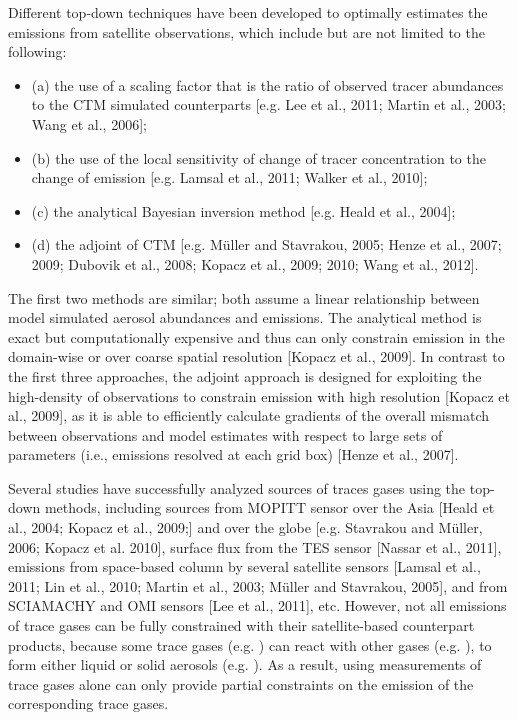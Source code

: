  Different top-down techniques have been developed to optimally estimates 
 the emissions from satellite observations, which include but are not 
 limited to the following: 
 \begin{itemize}
 \item (a) the use of a scaling factor that is the ratio of observed tracer abundances to 
 the CTM simulated counterparts [e.g. Lee et al., 2011; Martin et al., 2003; Wang et al., 2006];
 \item (b) the use of the local sensitivity of change of tracer concentration 
            to the change of emission [e.g. Lamsal et al., 2011; Walker et al., 2010]; 
 \item (c) the analytical Bayesian inversion method [e.g. Heald et al., 2004]; 
 \item (d) the adjoint of CTM [e.g. Müller and Stavrakou, 2005; 
           Henze et al., 2007; 2009; Dubovik et al., 2008; Kopacz et al., 2009; 2010; 
           Wang et al., 2012].  
 \end{itemize} 
 The first two methods are similar; 
 both assume a linear relationship between model simulated aerosol abundances and emissions. 
 The analytical method is exact but computationally expensive 
 and thus can only constrain emission in the domain-wise 
 or over coarse spatial resolution [Kopacz et al., 2009]. 
 In contrast to the first three approaches, the adjoint approach is designed 
 for exploiting the high-density of observations to constrain emission 
 with high resolution [Kopacz et al., 2009], as it is able to efficiently 
 calculate gradients of the overall mismatch between observations 
 and model estimates with respect to large sets of parameters 
 (i.e., emissions resolved at each grid box) [Henze et al., 2007].

 Several studies have successfully analyzed sources of 
 traces gases using the top-down methods, including  sources 
 from MOPITT sensor over the Asia [Heald et al., 2004; Kopacz et al., 2009;] 
 and over the globe [e.g. Stavrakou and Müller, 2006; Kopacz et al. 2010], 
  surface flux from the TES sensor [Nassar et al., 2011], 
  emissions from space-based column  by several satellite sensors 
 [Lamsal et al., 2011; Lin et al., 2010; Martin et al., 2003; Müller and Stavrakou, 2005], 
 and  from SCIAMACHY and OMI sensors [Lee et al., 2011], etc. 
 However, not all emissions of trace gases can be fully constrained with their 
 satellite-based counterpart products, because some trace gases (e.g. ) 
 can react with other gases (e.g. ), to form either liquid or solid aerosols 
 (e.g. ). As a result, using measurements of trace gases alone 
 can only provide partial constraints on the emission of the corresponding trace gases. 

